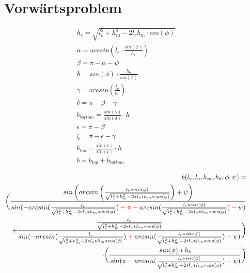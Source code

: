 \documentclass[12pt,a4paper, landscape]{article}
\author{Vera Loeser}
\begin{document}
	\section{Vorw\"artsproblem}

\begin{align*}
h_r = \sqrt{l_e^2 + h_m^2 - 2l_eh_m\cdot cos(\phi)}\\
\alpha =arcsin\left(l_e \cdot \frac{sin(\phi)}{h_r}\right)\\
\beta = \pi - \alpha - \psi\\
h = sin(\phi) \cdot \frac{h_b}{sin(\beta)}\\
\gamma = arcsin(\frac{l_r}{h_r})\\
\delta = \pi - \beta - \gamma\\
b_{bottom} = \frac{sin(\gamma)}{sin(\delta)}\cdot h\\
\epsilon = \pi - \beta\\
\zeta = \pi - \epsilon - \gamma\\
b_{top} = \frac{sin(\epsilon)}{sin(\zeta)}\cdot h\\
b = b_{top} + b_{bottom}
\end{align*}
\newpage

\begin{align*}
\begin{split}
b (l_r, l_e, h_m, h_b, \phi, \psi) =\\ \bigg(\frac{sin\left(arcsin\left(\frac{l_e*sin(\phi)}{\sqrt{l_e ^2 + h_m^2 - 2*l_e*h_m * cos(\phi)}}\right)+\psi\right) }{sin(-arcsin(\frac{l_r}{\sqrt{l_e ^2 + h_m^2 - 2*l_e*h_m * cos(\phi)}})\color{red} + \pi - \color{black} arcsin(\frac{l_e * sin(\phi)}{\sqrt{l_e ^2 + h_m^2 - 2*l_e*h_m * cos(\phi)}}) \color{red} - \color{black} \psi)}\\ 
+ \frac{\frac{l_r}{\sqrt{l_e ^2 + h_m^2 - 2*l_e*h_m * cos(\phi)}}}{sin(-arcsin(\frac{l_r}{\sqrt{l_e ^2 + h_m^2 - 2*l_e*h_m * cos(\phi)}}) \color{red}+\color{black} arcsin(\frac{l_e * sin(\phi)}{\sqrt{l_e ^2 + h_m^2 - 2*l_e*h_m * cos(\phi)}}) \color{red} + \color{black} \psi)}\bigg)\\
\cdot\bigg(\frac{sin(\phi) * h_b}{sin(\pi - arcsin(\frac{l_e * sin(\phi)}{\sqrt{l_e ^2 + h_m^2 - 2*l_e*h_m * cos(\phi)}}) - \psi)}\bigg)
\end{split}
\end{align*}
\newpage
\end{document}
